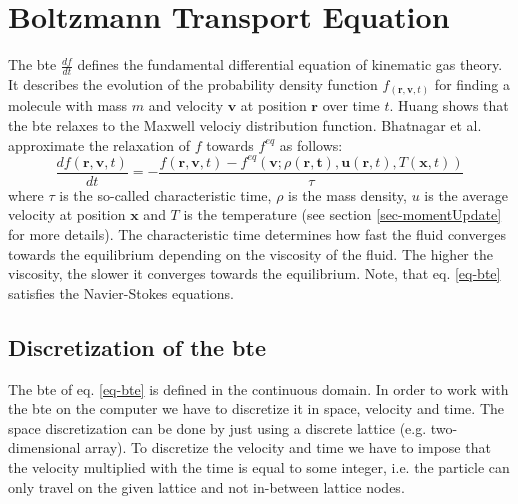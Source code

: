 \documentclass[a4paper,11pt, footsepline]{book}
\begin{document}
\section{Boltzmann Transport Equation}\label{sec-bte}
The \acf{bte} $\frac{df}{dt}$ defines the fundamental differential equation of kinematic gas theory. It describes the evolution of the probability density function $f_(\mathbf{r},\mathbf{v},t)$ for finding a molecule with mass $m$ and velocity $\mathbf{v}$ at position $\mathbf{r}$ over time $t$. Huang \cite{Huang.1987} shows that the \ac{bte} relaxes to the Maxwell velociy distribution function. Bhatnagar et al. \cite{Bhatnagar.1954} approximate the relaxation of $f$ towards $f^{eq}$ as follows:
\begin{equation}
\label{eq-bte}
\frac{df(\mathbf{r},\mathbf{v},t)}{dt}=-\frac{f(\mathbf{r},\mathbf{v},t)-f^{eq}(\mathbf{v};\rho(\mathbf{r,t}),\mathbf{u}(\mathbf{r},t),T(\mathbf{x},t))}{\tau}
\end{equation}
where $\tau$ is the so-called characteristic time, $\rho$ is the mass density, $u$ is the average velocity at position $\mathbf{x}$ and $T$ is the temperature (see section \ref{sec-momentUpdate} for more details). The characteristic time determines how fast the fluid converges towards the equilibrium depending on the viscosity of the fluid. The higher the viscosity, the slower it converges towards the equilibrium. Note, that eq. \ref{eq-bte} satisfies the Navier-Stokes equations.
\subsection*{Discretization of the \ac{bte}}
The \ac{bte} of eq. \ref{eq-bte} is defined in the continuous domain. In order to work with the \ac{bte} on the computer we have to discretize it in space, velocity and time. The space discretization can be done by just using a discrete lattice (e.g. two-dimensional array). To discretize the velocity and time we have to impose that the velocity multiplied with the time is equal to some integer, i.e. the particle can only travel on the given lattice and not in-between lattice nodes. 
\end{document}
